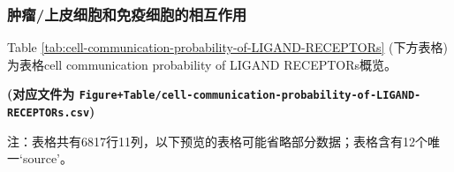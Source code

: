 \documentclass[
]{article}
\begin{document}
\hypertarget{ux80bfux7624ux4e0aux76aeux7ec6ux80deux548cux514dux75abux7ec6ux80deux7684ux76f8ux4e92ux4f5cux7528-1}{%
\subsubsection{肿瘤/上皮细胞和免疫细胞的相互作用}\label{ux80bfux7624ux4e0aux76aeux7ec6ux80deux548cux514dux75abux7ec6ux80deux7684ux76f8ux4e92ux4f5cux7528-1}}

Table \ref{tab:cell-communication-probability-of-LIGAND-RECEPTORs} (下方表格) 为表格cell communication probability of LIGAND RECEPTORs概览。

\textbf{(对应文件为 \texttt{Figure+Table/cell-communication-probability-of-LIGAND-RECEPTORs.csv})}

\begin{center}\begin{tcolorbox}[colback=gray!10, colframe=gray!50, width=0.9\linewidth, arc=1mm, boxrule=0.5pt]注：表格共有6817行11列，以下预览的表格可能省略部分数据；表格含有12个唯一`source'。
\end{tcolorbox}
\end{center}
\end{document}

